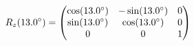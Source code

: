 \documentclass[preview]{standalone}
\begin{document}
\begin{align*}
\special{dvisvgm:raw <g id='unique000'>}R_z(13.0^\circ) = \begin{pmatrix} \cos(13.0^\circ) & -\sin(13.0^\circ) & 0 \\ \sin(13.0^\circ) & \cos(13.0^\circ) & 0 \\ 0 & 0 & 1 \end{pmatrix}\special{dvisvgm:raw </g>}
\end{align*}
\end{document}
